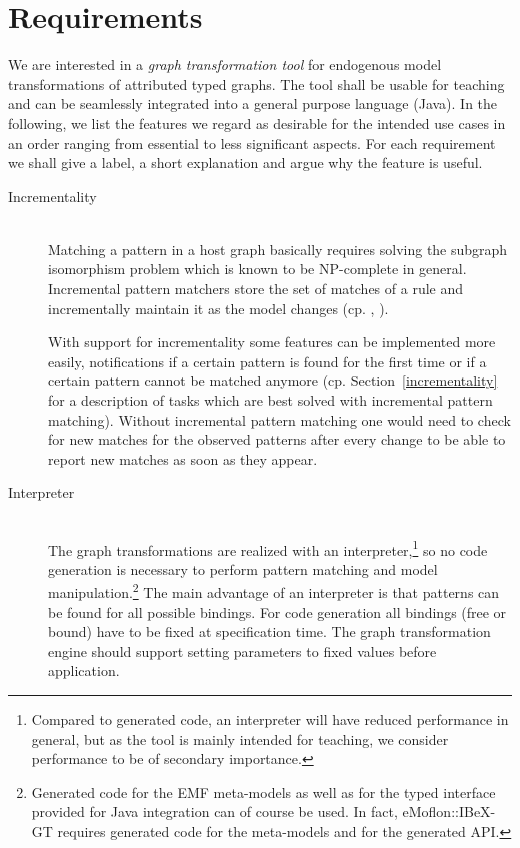 \chapter{Requirements}
\label{requirements}
We are interested in a \textit{graph transformation tool} for endogenous model transformations of attributed typed graphs.
The tool shall be usable for teaching and can be seamlessly integrated into a general purpose language (Java).
In the following, we list the features we regard as desirable for the intended use cases in an order ranging from essential to less significant aspects.
For each requirement we shall give a label, a short explanation and argue why the feature is useful.

\begin{description}
	\item[Incrementality] ~\\
		Matching a pattern in a host graph basically requires solving the subgraph isomorphism problem which is known to be NP-complete in general.
		Incremental pattern matchers store the set of matches of a rule and incrementally maintain it as the model changes
		(cp. \cite{IncrementalGraphPatternMatching}, \cite{EvaluationOfIncrementalPatternMatching}).

		With support for incrementality some features can be implemented more easily,
		\eg notifications if a certain pattern is found for the first time
		or if a certain pattern cannot be matched anymore
		(cp. Section~\ref{incrementality} for a description of tasks which are best solved with incremental pattern matching).
		Without incremental pattern matching one would need to check for new matches for the observed patterns after every change to be able to report new matches as soon as they appear.

	\item[Interpreter] ~\\
		The graph transformations are realized with an interpreter,\footnote{Compared to generated code, an interpreter will have reduced performance in general, but as the tool is mainly intended for teaching, we consider performance to be of secondary importance.}
		so no code generation is necessary to perform pattern matching and model manipulation.\footnote{Generated code for the EMF meta-models as well as for the typed interface provided for Java integration can of course be used. In fact, eMoflon::IBeX-GT requires generated code for the meta-models and for the generated API.}
		The main advantage of an interpreter is that patterns can be found for all possible bindings.
		For code generation all bindings (free or bound) have to be fixed at specification time.
		The graph transformation engine should support setting parameters to fixed values before application.


\end{description}
